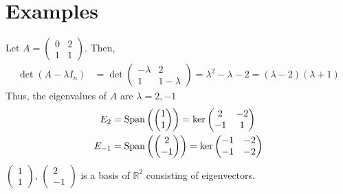 \documentclass[letterpaper,12pt]{article}
\begin{document}
\section*{Examples}
\begin{example}
Let $A = \begin{pmatrix} 0 & 2 \\ 1 & 1 \end{pmatrix}$. Then,
\begin{align*}
    \det{(A - \lambda I_n)} & = \det{\begin{pmatrix} -\lambda & 2 \\ 1 & 1 - \lambda \end{pmatrix}} = \lambda^2 - \lambda - 2 = (\lambda - 2)(\lambda + 1)
\end{align*}
Thus, the eigenvalues of $A$ are $\lambda = 2, -1$
\begin{align*}
    E_2 & = \text{Span}\left(\begin{pmatrix} 1 \\ 1 \end{pmatrix} \right) = \ker{\begin{pmatrix} 2 & -2 \\ -1 & 1 \end{pmatrix}} \\
    E_{-1} & = \text{Span}\left(\begin{pmatrix} 2 \\ -1 \end{pmatrix} \right) = \ker{\begin{pmatrix} -1 & -2 \\ -1 & -2 \end{pmatrix}}
\end{align*}
$\begin{pmatrix} 1 \\ 1 \end{pmatrix}$, $\begin{pmatrix} 2 \\ -1 \end{pmatrix}$ is a basis of $\mathbb{R}^2$ consisting of eigenvectors.
\end{example}
\end{document}
